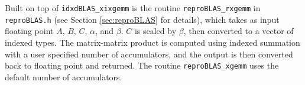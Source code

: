   Built on top of \texttt{idxdBLAS\_xixgemm} is the routine \texttt{reproBLAS\_rxgemm} in \texttt{reproBLAS.h} (see Section \ref{sec:reproBLAS} for details), which takes as input floating point $A$, $B$, $C$, $\alpha$, and $\beta$. $C$ is scaled by $\beta$, then converted to a vector of indexed types. The matrix-matrix product is computed using indexed summation with a user specified number of accumulators, and the output is then converted back to floating point and returned. The routine \texttt{reproBLAS\_xgemm} uses the default number of accumulators.
